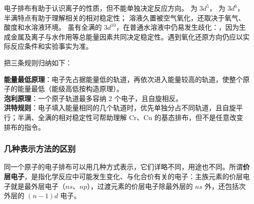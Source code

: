 
电子排布有助于认识离子的性质，但不能单独决定反应方向。 为 $3d^5$， 为 $3d^6$，半满特点有助于理解相关的相对稳定性； 溶液久置被空气氧化，还取决于氧气、酸度和水溶液环境。 虽有全满的 $3d^{10}$，在普通水溶液中仍易发生歧化：，因为生成金属及离子与水作用等总能量因素共同决定稳定性。遇到氧化还原方向仍应以实际反应条件和实验事实为准。

把三条规则归纳如下：

\begin{gainian}[基态原子核外电子排布的规则]
\textbf{能量最低原理}：电子先占据能量低的轨道，再依次进入能量较高的轨道，使整个原子的能量最低（能级高低按构造原理）。\\
\textbf{泡利原理}：一个原子轨道最多容纳 2 个电子，且自旋相反。\\
\textbf{洪特规则}：电子填入能量相同的几个轨道时，优先单独分占不同轨道，且自旋平行；半满、全满的相对稳定性可帮助理解 Cr、Cu 的基态排布，但不是任意改变排布的指令。
\end{gainian}

\subsubsection{几种表示方法的区别}
同一个原子的电子排布可以用几种方式表示，它们详略不同，用途也不同。所谓\textbf{价层电子}，是指化学反应中可能发生变化、与化合价有关的电子：主族元素的价层电子就是最外层电子（$ns$、$np$），过渡元素的价层电子除最外层的 $ns$ 外，还包括次外层的 $(n-1)d$ 电子。

